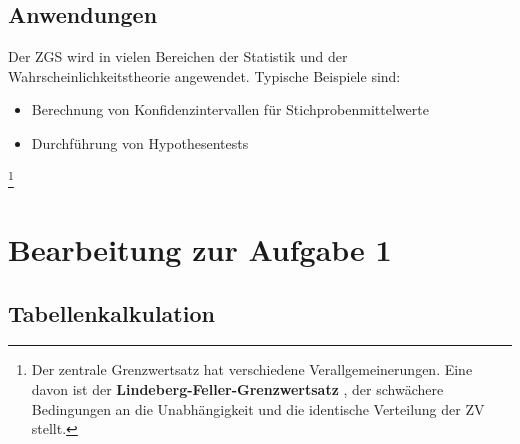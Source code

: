 \documentclass{article}
\begin{document}
\subsection{Anwendungen}
Der ZGS wird in vielen Bereichen der Statistik und der Wahrscheinlichkeitstheorie angewendet. Typische Beispiele sind:

\begin{itemize}
    \item Berechnung von Konfidenzintervallen für Stichprobenmittelwerte
    \item Durchführung von Hypothesentests
\end{itemize}

\footnote{Der zentrale Grenzwertsatz hat verschiedene Verallgemeinerungen. Eine davon ist der \textbf{Lindeberg-Feller-Grenzwertsatz} \cite[Seite 328]{klenke}, der schwächere Bedingungen an die Unabhängigkeit und die identische Verteilung der ZV stellt.}

\newpage
\section{Bearbeitung zur Aufgabe 1}

\subsection{ Tabellenkalkulation}
\end{document}
